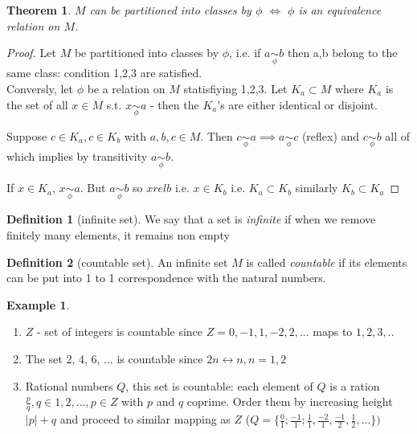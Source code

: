 \documentclass[11pt,a4paper]{report}
\theoremstyle{plain}
\newtheorem{thm}{Theorem}[section]
\theoremstyle{definition}
\newtheorem*{defn}{Definition}
\newtheorem*{eg}{Example}
\theoremstyle{remark}
\newcommand{\phirel}{\underset{\phi}{\sim}}
\begin{document}
\begin{thm}
  $M$ can be partitioned into classes by $\phi$ $\Leftrightarrow$ $\phi$ is an equivalence relation on $M$.
\end{thm}

\begin{proof}
Let $M$ be partitioned into classes by $\phi$, i.e. if $a \phirel b$ then a,b belong to the same class: condition 1,2,3 are satisfied.\\
Conversly, let $\phi$ be a relation on $M$ statisfiying 1,2,3.
Let $K_a \subset M$ where $K_a$ is the set of all $x \in M$ s.t. $x \phirel a$ - then the $K_a$'s are either identical or disjoint.

Suppose $c \in K_a, c \in K_b$ with $a,b,c \in M$.
Then $c \phirel a \implies a \phirel c$ (reflex) and $c \phirel b$
all of which implies by transitivity $a \phirel b$.

If $x\in K_a$, $x \phirel a$. But $a \phirel b$ so $x rel b$ i.e. $x \in K_b$
i.e. $K_a \subset K_b$ similarly $K_b \subset K_a$
\end{proof}

\begin{defn}[infinite set]
We say that a set is \textit{infinite} if when we remove finitely many elements, it remains non empty
\end{defn}

\begin{defn}[countable set]
An infinite set $M$ is called \textit{countable} if its elements can be put into 1 to 1 correspondence with the natural numbers.
\end{defn}

\begin{eg}\;\
  \begin{enumerate}
     \item $Z$ - set of integers is countable since $Z = {0, -1, 1, -2, 2, ...}$ maps to ${1,2,3, ..}$
     \item The set {2, 4, 6, ...} is countable since $2n \leftrightarrow n, n =1,2$
     \item Rational numbers $Q$, this set is countable: each element of $Q$ is a ration $\frac{p}{q}, q \in {1,2,...}, p \in Z$ with $p$ and $q$ coprime.
Order them by increasing height $|p| + q$ and proceed to similar mapping as $Z$ ($Q=\{ \frac{0}{1}; \frac{-1}{1}; \frac{1}{1}, \frac{-2}{1}, \frac{-1}{2}, \frac{1}{2}, ...\})$
    \end{enumerate}
\end{eg}
\end{document}
